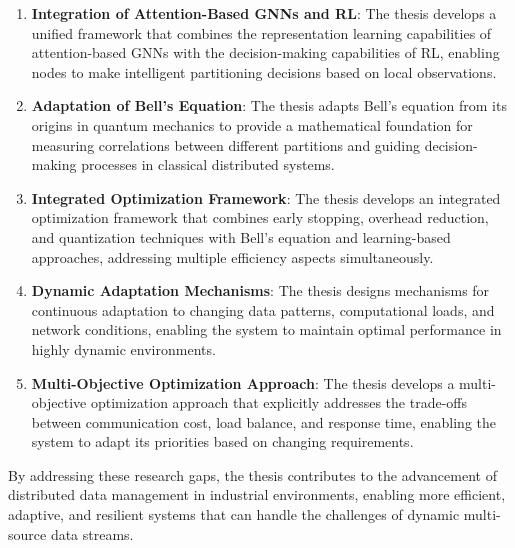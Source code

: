 \documentclass{article}
\begin{document}
\begin{enumerate}
    \item \textbf{Integration of Attention-Based GNNs and RL}: The thesis develops a unified framework that combines the representation learning capabilities of attention-based GNNs with the decision-making capabilities of RL, enabling nodes to make intelligent partitioning decisions based on local observations.
    
    \item \textbf{Adaptation of Bell's Equation}: The thesis adapts Bell's equation from its origins in quantum mechanics to provide a mathematical foundation for measuring correlations between different partitions and guiding decision-making processes in classical distributed systems.
    
    \item \textbf{Integrated Optimization Framework}: The thesis develops an integrated optimization framework that combines early stopping, overhead reduction, and quantization techniques with Bell's equation and learning-based approaches, addressing multiple efficiency aspects simultaneously.
    
    \item \textbf{Dynamic Adaptation Mechanisms}: The thesis designs mechanisms for continuous adaptation to changing data patterns, computational loads, and network conditions, enabling the system to maintain optimal performance in highly dynamic environments.
    
    \item \textbf{Multi-Objective Optimization Approach}: The thesis develops a multi-objective optimization approach that explicitly addresses the trade-offs between communication cost, load balance, and response time, enabling the system to adapt its priorities based on changing requirements.
\end{enumerate}

By addressing these research gaps, the thesis contributes to the advancement of distributed data management in industrial environments, enabling more efficient, adaptive, and resilient systems that can handle the challenges of dynamic multi-source data streams.
\end{document}
